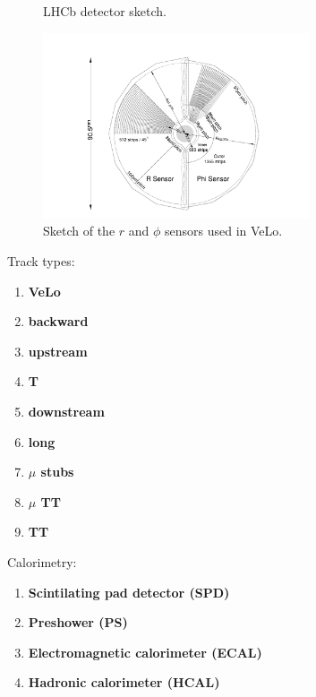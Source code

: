 \documentclass[11pt,a4paper,twoside]{article}
\begin{document}
\begin{enumerate}
\begin{figure}[H]
            \caption{LHCb detector sketch.}
            \label{fig:001-LHCb_detector}
        \end{figure}

        \begin{figure}[H]
            \centering

            \includegraphics[width=0.7\textwidth]{visuals/006-sensors-in-VeLo.png}
            
            \caption{Sketch of the $r$ and $\phi$ sensors used in VeLo.}
            \label{fig:001-LHCb_detector}
        \end{figure}


        Track types:
        \begin{enumerate}
            \item \textbf{VeLo}
            \item \textbf{backward}
            \item \textbf{upstream}
            \item \textbf{T}
            \item \textbf{downstream}
            \item \textbf{long}
            \item \textbf{$\mu$ stubs}
            \item \textbf{$\mu$ TT}
            \item \textbf{TT}
        \end{enumerate}

        Calorimetry:
        \begin{enumerate}
            \item \textbf{Scintilating pad detector (SPD)}
            \item \textbf{Preshower (PS)}
            \item \textbf{Electromagnetic calorimeter (ECAL)}
            \item \textbf{Hadronic calorimeter (HCAL)}
        \end{enumerate}


\end{enumerate}
\end{document}
